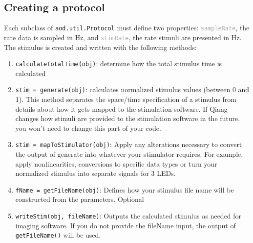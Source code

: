 \documentclass[10pt]{exam}
\newcommand\aodclass[1]{\textcolor{codeblue}{\texttt{#1}}}
\newcommand\aodprop[1]{\textcolor{darkgray}{\texttt{#1}}}
\newcommand\aodfcn[1]{\textcolor{darkteal}{\texttt{#1}}}
\begin{document}
	\subsection{Creating a protocol}
		\label{subsection:CreatingAProtocol}
		\noindent Each subclass of \aodclass{aod.util.Protocol} must define two properties: \aodprop{sampleRate}, the rate data is sampled in Hz, and \aodprop{stimRate}, the rate stimuli are presented in Hz.
		\\
		The stimulus is created and written with the following methods:
		\begin{enumerate}
			\item \aodfcn{calculateTotalTime(obj)}: determine how the total stimulus time is calculated
			\item \aodfcn{stim = generate(obj)}: calculates normalized stimulus values (between 0 and 1). This method separates the space/time specification of a stimulus from details about how it gets mapped to the stimulation software. If Qiang changes how stimuli are provided to the stimulation software in the future, you won't need to change this part of your code.
			\item \aodfcn{stim = mapToStimulator(obj)}: Apply any alterations necessary to convert the output of generate into whatever your stimulator requires. For example, apply nonlinearities, conversions to specific data types or turn your normalized stimulus into separate signals for 3 LEDs.
			\item \aodfcn{fName = getFileName(obj)}: Defines how your stimulus file name will be constructed from the parameters. Optional
			\item \aodfcn{writeStim(obj, fileName)}: Outputs the calculated stimulus as needed for imaging software. If you do not provide the fileName input, the output of \aodfcn{getFileName()} will be used.
		\end{enumerate}
	
\end{document}
